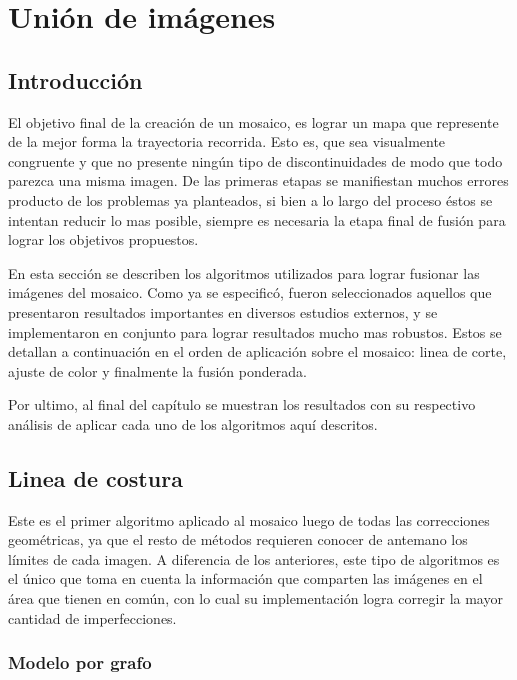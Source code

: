 \chapter{Unión de imágenes}
\label{capitulo5}


\section{Introducción}
El objetivo final de la creación de un mosaico, es lograr un mapa que represente de la mejor forma la trayectoria recorrida. Esto es, que sea visualmente congruente y que no presente ningún tipo de discontinuidades de modo que todo parezca una misma imagen. De las primeras etapas se manifiestan muchos errores producto de los problemas ya planteados, si bien a lo largo del proceso éstos se intentan reducir lo mas posible, siempre es necesaria la etapa final de fusión para lograr los objetivos propuestos.

En esta sección se describen los algoritmos utilizados para lograr fusionar las imágenes del mosaico. Como ya se especificó, fueron seleccionados aquellos que presentaron resultados importantes en diversos estudios externos, y se implementaron en conjunto para lograr resultados mucho mas robustos. Estos se detallan a continuación en el orden de aplicación sobre el mosaico: linea de corte, ajuste de color y finalmente la fusión ponderada.

Por ultimo, al final del capítulo se muestran los resultados con su respectivo análisis de aplicar cada uno de los algoritmos aquí descritos.
\clearpage


\section{Linea de costura}\label{seccion-corte}

Este es el primer algoritmo aplicado al mosaico luego de todas las correcciones geométricas, ya que el resto de métodos requieren conocer de antemano los límites de cada imagen. 
A diferencia de los anteriores, este tipo de algoritmos es el único que toma en cuenta la información que comparten las imágenes en el área que tienen en común, con lo cual su implementación logra corregir la mayor cantidad de imperfecciones. 


\subsection{Modelo por grafo}

